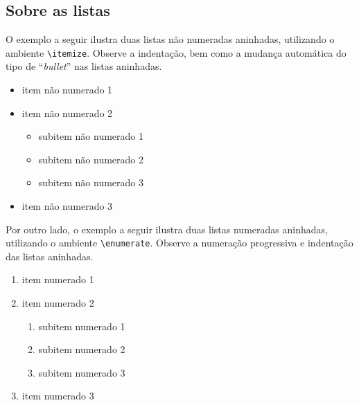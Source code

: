 \begin{apendicesenv}

    \chapter{Sobre as listas}
    \label{chap_sobre_as_listas}

    O exemplo a seguir ilustra duas listas não numeradas aninhadas, utilizando o ambiente \verb|\itemize|.
    Observe a indentação, bem como a mudança automática do tipo de ``\textit{bullet}'' nas listas aninhadas.

    \begin{itemize}
        \item item não numerado 1
        \item item não numerado 2
              \begin{itemize}
                  \item subitem não numerado 1
                  \item subitem não numerado 2
                  \item subitem não numerado 3
              \end{itemize}
        \item item não numerado 3
    \end{itemize}

    Por outro lado, o exemplo a seguir ilustra duas listas numeradas aninhadas, utilizando o ambiente \verb|\enumerate|.
    Observe a numeração progressiva e indentação das listas aninhadas.

    \begin{enumerate}
        \item item numerado 1
        \item item numerado 2
              \begin{enumerate}
                  \item subitem numerado 1
                  \item subitem numerado 2
                  \item subitem numerado 3
              \end{enumerate}
        \item item numerado 3
    \end{enumerate}



\end{apendicesenv}
